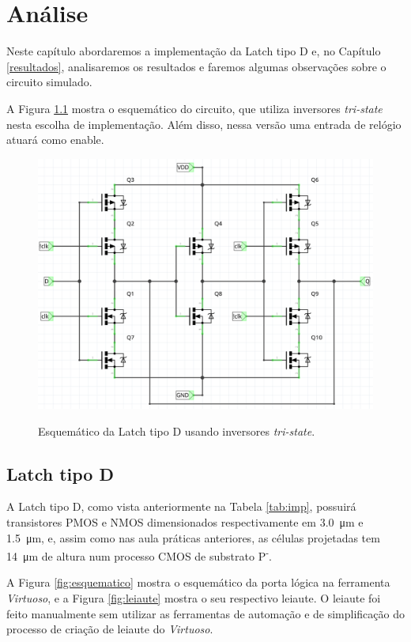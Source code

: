 \documentclass{iiufrgs}
\newcommand{\virtuoso}{\textit{Virtuoso}}
\begin{document}
\chapter{Análise}\label{analise}
Neste capítulo abordaremos a implementação da Latch tipo D e, no Capítulo \ref{resultados}, analisaremos os resultados e faremos algumas observações sobre o circuito simulado.

A Figura \ref{fig:latch} mostra o esquemático do circuito, que utiliza inversores \textit{tri-state} nesta escolha de implementação. Além disso, nessa versão uma entrada de relógio atuará como enable.
 
\begin{figure}[htbp]
    \centering
    \caption{Esquemático da Latch tipo D usando inversores \textit{tri-state}.}
    \includegraphics[scale=0.5]{images/schem_pretty_transistors.png}
    \label{fig:latch}
\end{figure}

\section{Latch tipo D}\label{nand}
A Latch tipo D, como vista anteriormente na Tabela \ref{tab:imp}, possuirá transistores PMOS e NMOS dimensionados respectivamente em \SI{3.0}{\um} e \SI{1.5}{\um}, e, assim como nas aula práticas anteriores, as células projetadas tem \SI{14}{\um} de altura num processo CMOS de substrato P\textsuperscript{-}.

A Figura \ref{fig:esquematico} mostra o esquemático da porta lógica na ferramenta \virtuoso, e a Figura \ref{fig:leiaute} mostra o seu respectivo leiaute. O leiaute foi feito manualmente sem utilizar as ferramentas de automação e de simplificação do processo de criação de leiaute do \virtuoso.
\end{document}
